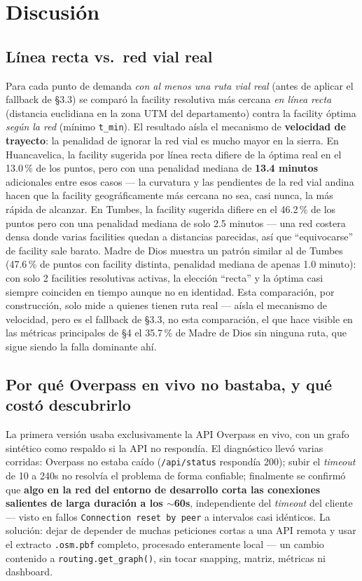 \documentclass[11pt]{article}
\begin{document}
\section{Discusión}

\subsection{Línea recta vs.\ red vial real}



Para cada punto de demanda \emph{con al menos una ruta vial real} (antes
de aplicar el fallback de \S3.3) se comparó la facility resolutiva más
cercana \emph{en línea recta} (distancia euclidiana en la zona UTM del
departamento) contra la facility óptima \emph{según la red} (mínimo
\texttt{t\_min}). El resultado aísla el mecanismo de \textbf{velocidad de
trayecto}: la penalidad de ignorar la red vial es mucho mayor en la
sierra. En Huancavelica, la facility sugerida por línea recta difiere de
la óptima real en el 13.0\,\% de los puntos, pero con una penalidad
mediana de \textbf{13.4 minutos} adicionales entre esos casos --- la
curvatura y las pendientes de la red vial andina hacen que la facility
geográficamente más cercana no sea, casi nunca, la más rápida de
alcanzar. En Tumbes, la facility sugerida difiere en el 46.2\,\% de los
puntos pero con una penalidad mediana de solo 2.5 minutos --- una red
costera densa donde varias facilities quedan a distancias parecidas, así
que ``equivocarse'' de facility sale barato. Madre de Dios muestra un
patrón similar al de Tumbes (47.6\,\% de puntos con facility distinta,
penalidad mediana de apenas 1.0 minuto): con solo 2 facilities resolutivas
activas, la elección ``recta'' y la óptima casi siempre coinciden en
tiempo aunque no en identidad. Esta comparación, por construcción, solo
mide a quienes tienen ruta real --- aísla el mecanismo de velocidad, pero
es el fallback de \S3.3, no esta comparación, el que hace visible en las
métricas principales de \S4 el 35.7\,\% de Madre de Dios sin ninguna ruta,
que sigue siendo la falla dominante ahí.

\subsection{Por qué Overpass en vivo no bastaba, y qué costó descubrirlo}

La primera versión usaba exclusivamente la API Overpass en vivo, con un
grafo sintético como respaldo si la API no respondía. El diagnóstico llevó
varias corridas: Overpass no estaba caído (\texttt{/api/status} respondía
200); subir el \emph{timeout} de 10 a 240s no resolvía el problema de forma
confiable; finalmente se confirmó que \textbf{algo en la red del entorno de
desarrollo corta las conexiones salientes de larga duración a los
${\sim}$60s}, independiente del \emph{timeout} del cliente --- visto en
fallos \texttt{Connection reset by peer} a intervalos casi idénticos. La
solución: dejar de depender de muchas peticiones cortas a una API remota y
usar el extracto \texttt{.osm.pbf} completo, procesado enteramente local
--- un cambio contenido a \texttt{routing.get\_graph()}, sin tocar
snapping, matriz, métricas ni dashboard.
\end{document}

